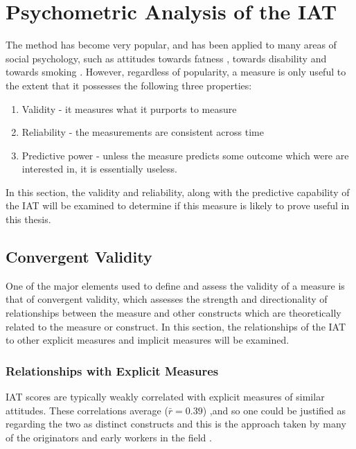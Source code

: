 \section{Psychometric Analysis of the IAT}
\label{sec:uses-psych-feat}

The method has become very popular, and has been applied to many areas of social psychology, such as attitudes towards fatness \cite{Ahern2008}, towards disability \cite{Pruett2006} and towards smoking \cite{Kahler2007}. However, regardless of popularity, a measure is only useful to the extent that it possesses the following three properties:


\begin{enumerate}
\item Validity - it measures what it purports to measure
\item Reliability - the measurements are consistent across time
\item Predictive power - unless the measure predicts some outcome which were are interested in, it is essentially useless.
\end{enumerate}

In this section, the validity and reliability, along with the predictive capability of the IAT will be examined to determine if this measure is likely to prove useful in this thesis. 

\subsection{Convergent Validity}
\label{sec:convergent-validity}

One of the major elements used to define and assess the validity of a measure is that of convergent validity, which assesses the strength and directionality of relationships between the measure and other constructs which are theoretically related to the measure or construct. In this section, the relationships of the IAT to other explicit measures and implicit measures will be examined. 


\subsubsection{Relationships with Explicit Measures}
\label{sec:relat-with-expl}



IAT scores are typically weakly correlated with explicit measures of similar attitudes. These correlations average ($\bar r=0.39$) \cite{Nosek2005},and so one could be justified as regarding the two as distinct constructs \cite{Nosek2007a} and this is the approach taken by many of the originators and early workers in the field \cite{Greenwald2000,Nosek2007a}. 

